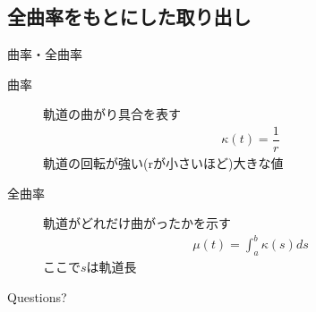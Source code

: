 \documentclass[12pt, xetex, xcolor=pdftex, dvipsnames]{beamer}
\begin{document}
\subsection{全曲率をもとにした取り出し}
\begin{frame}{曲率・全曲率}
  \begin{description}
    \item[曲率] 軌道の曲がり具合を表す
    \begin{align}
      \kappa(t) = \dfrac{1}{r}
    \end{align}
      軌道の回転が強い(rが小さいほど)大きな値
    \item[全曲率] 軌道がどれだけ曲がったかを示す
    \begin{align}
      \mu(t) = \int_a^b \kappa(s)ds
    \end{align}
    ここで$s$は軌道長
  \end{description}
\end{frame}

\begin{frame}[standout]
  Questions?
\end{frame}
\end{document}
